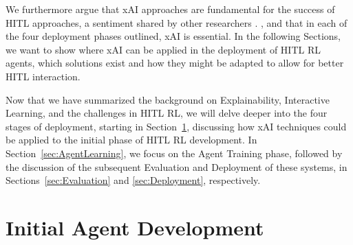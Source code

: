 \documentclass[twoside,11pt]{article}
\begin{document}
\begin{enumerate}
We furthermore argue that xAI approaches are fundamental for the success of HITL approaches, a sentiment shared by other researchers \citep{heuillet2021explainability,milani2022survey}. , and that in each of the four deployment phases outlined, xAI is essential. In the following Sections, we want to show where xAI can be applied in the deployment of HITL RL agents, which solutions exist and how they might be adapted to allow for better HITL interaction.

Now that we have summarized the background on Explainability, Interactive Learning, and the challenges in HITL RL, we will delve deeper into the four stages of deployment, starting in Section~\ref{sec:Developing}, discussing how xAI techniques could be applied to the initial phase of HITL RL development. In Section~\ref{sec:AgentLearning}, we focus on the Agent Training phase, followed by the discussion of the subsequent Evaluation and Deployment of these systems, in Sections~\ref{sec:Evaluation} and \ref{sec:Deployment}, respectively.


\section{Initial Agent Development}
\label{sec:Developing}


\end{enumerate}
\end{document}
